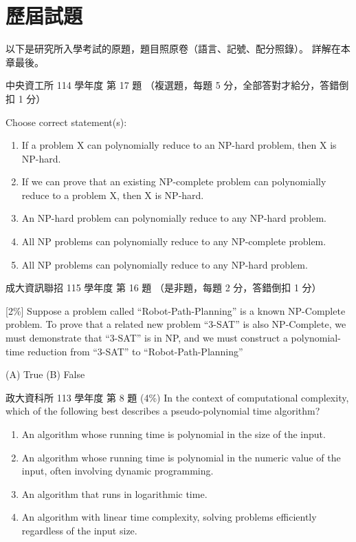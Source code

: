 \section{歷屆試題}
\label{sec:npc-pastexam}

以下是研究所入學考試的原題，題目照原卷（語言、記號、配分照錄）。 詳解在本章最後。

\begin{pastexam}[label={px:npc-1}]{中央資工所 114 學年度 第 17 題}
（複選題，每題 5 分，全部答對才給分，答錯倒扣 1 分）

Choose correct statement(s):
\begin{enumerate}[label=(\alph*)]
\item If a problem X can polynomially reduce to an NP-hard problem, then X is NP-hard.
\item If we can prove that an existing NP-complete problem can polynomially reduce to a problem X, then X is NP-hard.
\item An NP-hard problem can polynomially reduce to any NP-hard problem.
\item All NP problems can polynomially reduce to any NP-complete problem.
\item All NP problems can polynomially reduce to any NP-hard problem.
\end{enumerate}
\end{pastexam}

\begin{pastexam}[label={px:npc-2}]{成大資訊聯招 115 學年度 第 16 題}
（是非題，每題 2 分，答錯倒扣 1 分）

[2\%] Suppose a problem called ``Robot-Path-Planning'' is a known NP-Complete problem. To prove that a
related new problem ``3-SAT'' is also NP-Complete, we must demonstrate that ``3-SAT'' is in NP, and we must
construct a polynomial-time reduction from ``3-SAT'' to ``Robot-Path-Planning''

(A) True \qquad (B) False
\end{pastexam}

\begin{pastexam}[label={px:npc-3}]{政大資科所 113 學年度 第 8 題}
(4\%) In the context of computational complexity, which of the following best describes a
pseudo-polynomial time algorithm?
\begin{enumerate}[label=\Alph*.]
\item An algorithm whose running time is polynomial in the size of the input.
\item An algorithm whose running time is polynomial in the numeric value of the input, often involving
dynamic programming.
\item An algorithm that runs in logarithmic time.
\item An algorithm with linear time complexity, solving problems efficiently regardless of the input size.
\end{enumerate}
\end{pastexam}

